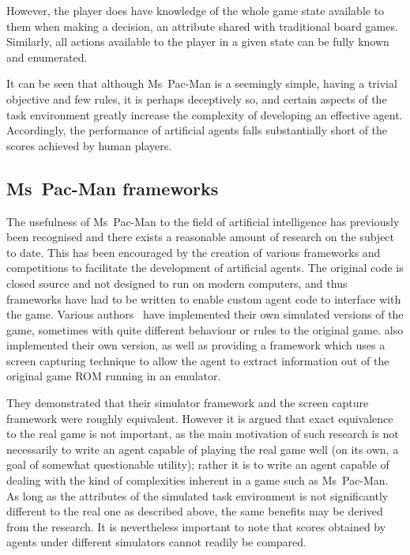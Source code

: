 However, the player does have knowledge of the whole game state available to them when making a decision, an attribute shared with traditional board games.  Similarly, all actions available to the player in a given state can be fully known and enumerated.

It can be seen that although Ms~Pac-Man is a seemingly simple, having a trivial objective and few rules, it is perhaps deceptively so, and certain aspects of the task environment greatly increase the complexity of developing an effective agent.  Accordingly, the performance of artificial agents falls substantially short of the scores achieved by human players.

\subsection{Ms~Pac-Man frameworks}

The usefulness of Ms~Pac-Man to the field of artificial intelligence has previously been recognised and there exists a reasonable amount of research on the subject to date.  This has been encouraged by the creation of various frameworks and competitions to facilitate the development of artificial agents.  The original code is closed source and not designed to run on modern computers, and thus frameworks have had to be written to enable custom agent code to interface with the game.  Various authors~\citep{Lucas2005,Koza1992} have implemented their own simulated versions of the game, sometimes with quite different behaviour or rules to the original game. \citet{Robles2009} also implemented their own version, as well as providing a framework which uses a screen capturing technique to allow the agent to extract information out of the original game ROM running in an emulator.

They demonstrated that their simulator framework and the screen capture framework were roughly equivalent.  However it is argued that exact equivalence to the real game is not important, as the main motivation of such research is not necessarily to write an agent capable of playing the real game well (on its own, a goal of somewhat questionable utility); rather it is to write an agent capable of dealing with the kind of complexities inherent in a game such as Ms~Pac-Man.  As long as the attributes of the simulated task environment is not significantly different to the real one as described above, the same benefits may be derived from the research.  It is nevertheless important to note that scores obtained by agents under different simulators cannot readily be compared.

